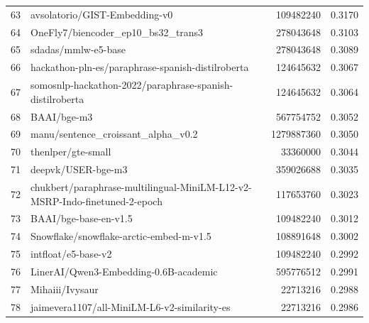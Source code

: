 {\begin{xltabular}{\textwidth}{l X rc}
    63               & avsolatorio/GIST-Embedding-v0                                              & 109482240     & 0.3170       \\
    64               & OneFly7/biencoder\_ep10\_bs32\_trans3                                      & 278043648     & 0.3103       \\
    65               & sdadas/mmlw-e5-base                                                        & 278043648     & 0.3089       \\
    66               & hackathon-pln-es/paraphrase-spanish-distilroberta                          & 124645632     & 0.3067       \\
    67               & somosnlp-hackathon-2022/paraphrase-spanish-distilroberta                   & 124645632     & 0.3064       \\
    68               & BAAI/bge-m3                                                                & 567754752     & 0.3052       \\
    69               & manu/sentence\_croissant\_alpha\_v0.2                                      & 1279887360    & 0.3050       \\
    70               & thenlper/gte-small                                                         & 33360000      & 0.3044       \\
    71               & deepvk/USER-bge-m3                                                         & 359026688     & 0.3035       \\
    72               & chukbert/paraphrase-multilingual-MiniLM-L12-v2-MSRP-Indo-finetuned-2-epoch & 117653760     & 0.3023       \\
    73               & BAAI/bge-base-en-v1.5                                                      & 109482240     & 0.3012       \\
    74               & Snowflake/snowflake-arctic-embed-m-v1.5                                    & 108891648     & 0.3002       \\
    75               & intfloat/e5-base-v2                                                        & 109482240     & 0.2992       \\
    76               & LinerAI/Qwen3-Embedding-0.6B-academic                                      & 595776512     & 0.2991       \\
    77               & Mihaiii/Ivysaur                                                            & 22713216      & 0.2988       \\
    78               & jaimevera1107/all-MiniLM-L6-v2-similarity-es                               & 22713216      & 0.2986       \\

\end{xltabular}}
